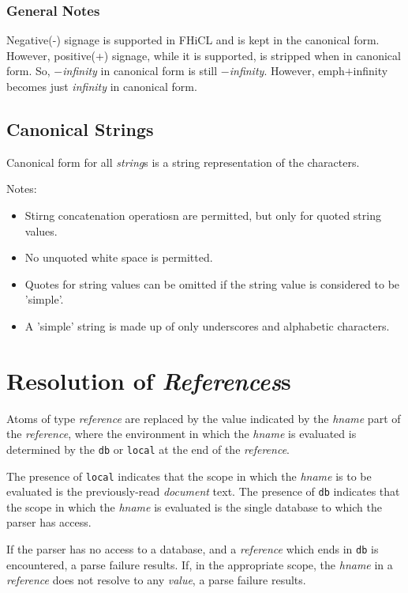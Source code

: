 \documentclass{memarticle}
\begin{document}
{			\subsubsection{General Notes}
				Negative(-) signage is supported in FHiCL and is kept in the canonical form.
				However, positive(+) signage, while it is supported, is stripped when in canonical form. 
				So, \emph{$-$infinity} in canonical form is still \emph{$-$infinity}.
				However, emph{$+$infinity} becomes just \emph{infinity} in canonical form.
		\subsection{Canonical Strings}
			Canonical form for all \emph{string}s is a string representation of the characters.
			\par
			Notes:
			\begin{itemize}
				\item Stirng concatenation operatiosn are permitted, but only for quoted string values.
				\item No unquoted white space is permitted.
				\item Quotes for string values can be omitted if the string value is considered to be 'simple'.
				\item A 'simple' string is made up of only underscores and alphabetic characters.
			\end{itemize}
        \section{Resolution of \emph{References}s}
                Atoms of type \emph{reference} are replaced
                by the value indicated by the \emph{hname} part of the \emph{reference},
                where the environment in which the \emph{hname} is evaluated is determined
                by the \texttt{db} or \texttt{local} at the end of the \emph{reference}.
                \par
                The presence of \texttt{local} indicates 
                that the scope in which the \emph{hname} is to be evaluated
                is the previously-read \emph{document} text.
                The presence of 
                \texttt{db} indicates
                that the scope in which the \emph{hname} is evaluated
                is the single database
                to which the parser has access.
                \par
                If the parser has no access to a database,
                and a \emph{reference} which ends in \texttt{db} is encountered,
                a parse failure results.
                If,
                in the appropriate scope,
                the \emph{hname} in a \emph{reference} does not resolve to any \emph{value},
                a parse failure results.
}
\end{document}

